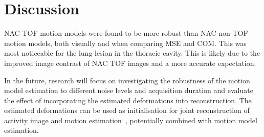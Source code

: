 \documentclass[journal]{IEEEtran}
\begin{document}
%

\section{Discussion}
NAC TOF motion models were found to be more robust than NAC non-TOF motion models, both visually and when comparing MSE and COM. This was most noticeable for the lung lesion in the thoracic cavity. This is likely due to the improved image contrast of NAC TOF images and a more accurate expectation.

In the future, research will focus on investigating the robustness of the motion model estimation to different noise levels and acquisition duration and evaluate the effect of incorporating the estimated deformations into reconstruction. The estimated deformations can be used as initialisation for joint reconstruction of activity image and motion estimation~\cite{Bousse2016a}, potentially combined with motion model estimation.



\end{document}
